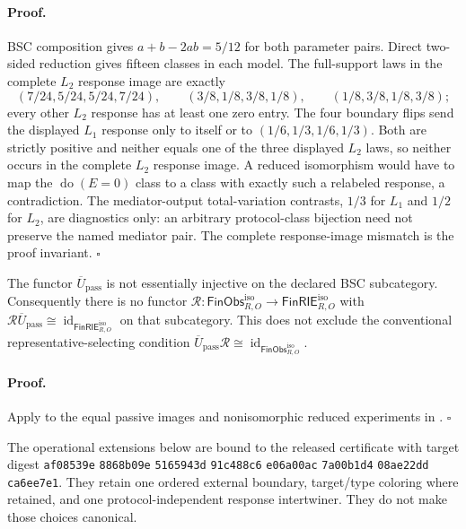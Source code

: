 \paragraph{Proof.}
BSC composition gives \(a+b-2ab=5/12\) for both parameter pairs.  Direct
two-sided reduction gives fifteen classes in each model.  The full-support
laws in the complete \(L_2\) response image are exactly
\begin{equation}
(7/24,5/24,5/24,7/24),\qquad
(3/8,1/8,3/8,1/8),\qquad
(1/8,3/8,1/8,3/8);
\label{eq:hist-intervention-ltwo-full-support-image}
\end{equation}
every other \(L_2\) response has at least one zero entry.  The four boundary
flips send the displayed \(L_1\) response only to itself or to
\((1/6,1/3,1/6,1/3)\).  Both are strictly positive and neither equals one
of the three displayed \(L_2\) laws, so neither occurs in the complete
\(L_2\) response image.  A reduced isomorphism would have to map the
\(\operatorname{do}(E=0)\) class to a class with exactly such a relabeled
response, a contradiction.  The mediator-output total-variation contrasts,
\(1/3\) for \(L_1\) and \(1/2\) for \(L_2\), are diagnostics only:
an arbitrary protocol-class bijection need not preserve the named mediator
pair.  The complete response-image mismatch is the proof invariant.
\(\square\)

The functor \(\overline U_{\mathrm{pass}}\) is not essentially injective on
the declared BSC subcategory.  Consequently there is no functor
\(\mathcal R:\mathsf{FinObs}_{R,O}^{\mathrm{iso}}
\to\mathsf{FinRIE}_{R,O}^{\mathrm{iso}}\) with
\(\mathcal R\overline U_{\mathrm{pass}}\cong
\operatorname{id}_{\mathsf{FinRIE}_{R,O}^{\mathrm{iso}}}\) on that
subcategory.  This does not exclude the conventional representative-selecting
condition
\(\overline U_{\mathrm{pass}}\mathcal R\cong
\operatorname{id}_{\mathsf{FinObs}_{R,O}^{\mathrm{iso}}}\).

\paragraph{Proof.}
Apply  to the equal
passive images and nonisomorphic reduced experiments in
.  \(\square\)

The operational extensions below are bound to the released certificate with
target digest
\texttt{af08539e}\allowbreak%
\texttt{8868b09e}\allowbreak%
\texttt{5165943d}\allowbreak%
\texttt{91c488c6}\allowbreak%
\texttt{e06a00ac}\allowbreak%
\texttt{7a00b1d4}\allowbreak%
\texttt{08ae22dd}\allowbreak%
\texttt{ca6ee7e1}.  They retain one ordered external boundary,
target/type coloring where retained, and one protocol-independent response intertwiner.
They do not make those choices canonical.  


